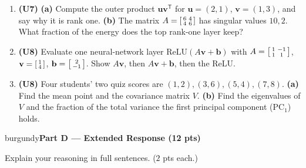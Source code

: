 \documentclass[10pt]{article}
\newcommand{\vv}{\mathbf{v}}
\newcommand{\bb}{\mathbf{b}}
\newcommand{\uu}{\mathbf{u}}
\newcommand{\relu}{\mathrm{ReLU}}
\newcommand{\T}{\mathsf{T}}
\newcommand{\parthead}[1]{%
  \vspace{6pt}\noindent
  \begin{headlinebox}{burgundy}{\color{white}\bfseries #1}\end{headlinebox}%
  \vspace{4pt}}
\begin{document}
\begin{enumerate}[leftmargin=1.9em, itemsep=10pt]
        and give the singular values of $A$.
        \vspace{2.6cm}
  \item \textbf{(U7)} \textbf{(a)} Compute the outer product $\uu\vv^\T$ for $\uu=(2,1)$, $\vv=(1,3)$, and say why it is
        rank one. \textbf{(b)} The matrix $A=\begin{bsmallmatrix}6&4\\4&6\end{bsmallmatrix}$ has singular values $10,2$.
        What fraction of the energy does the top rank-one layer keep?
        \vspace{2.4cm}
  \item \textbf{(U8)} Evaluate one neural-network layer $\relu(A\vv+\bb)$ with
        $A=\begin{bsmallmatrix}1&-1\\1&1\end{bsmallmatrix}$, $\vv=\begin{bsmallmatrix}1\\4\end{bsmallmatrix}$,
        $\bb=\begin{bsmallmatrix}2\\-1\end{bsmallmatrix}$. Show $A\vv$, then $A\vv+\bb$, then the ReLU.
        \vspace{2.4cm}
  \item \textbf{(U8)} Four students' two quiz scores are $(1,2),(3,6),(5,4),(7,8)$.
        \textbf{(a)} Find the mean point and the covariance matrix $V$.
        \textbf{(b)} Find the eigenvalues of $V$ and the fraction of the total variance the first principal
        component ($\mathrm{PC}_1$) holds.
        \vspace{2.8cm}
\end{enumerate}

\parthead{Part D --- Extended Response (12 pts)}
Explain your reasoning in full sentences. ($2$ pts each.)
\end{document}
